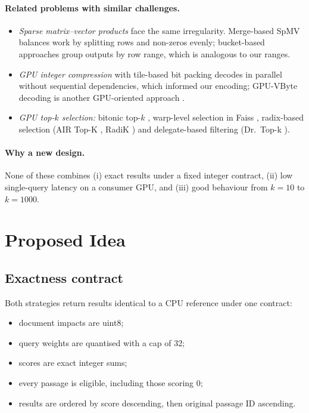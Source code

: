 \documentclass[11pt]{article}
\begin{document}
\paragraph{Related problems with similar challenges.}
\begin{itemize}
\item \emph{Sparse matrix--vector products} face the same irregularity. Merge-based SpMV
  \cite{mergespmv} balances work by splitting rows and non-zeros evenly; bucket-based approaches group
  outputs by row range, which is analogous to our ranges.
\item \emph{GPU integer compression} with tile-based bit packing \cite{gpufor} decodes in parallel
  without sequential dependencies, which informed our encoding; GPU-VByte decoding is another
  GPU-oriented approach \cite{zahrangpuvbyte}.
\item \emph{GPU top-$k$ selection:} bitonic top-$k$ \cite{bitonictopk}, warp-level selection in Faiss
  \cite{faiss}, radix-based selection (AIR Top-K \cite{airtopk}, RadiK \cite{radik}) and
  delegate-based filtering (Dr.~Top-k \cite{drtopk}).
\end{itemize}

\paragraph{Why a new design.} None of these combines (i) exact results under a fixed integer contract,
(ii) low single-query latency on a consumer GPU, and (iii) good behaviour from $k=10$ to $k=1000$.

\section{Proposed Idea}

\subsection{Exactness contract}
Both strategies return results identical to a CPU reference under one contract:
\begin{itemize}
\item document impacts are uint8;
\item query weights are quantised with a cap of 32;
\item scores are exact integer sums;
\item every passage is eligible, including those scoring 0;
\item results are ordered by score descending, then original passage ID ascending.
\end{itemize}
\end{document}
